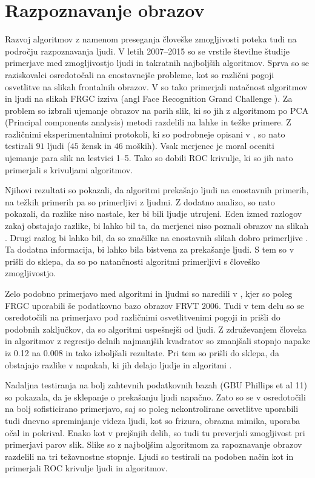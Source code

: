 \section{Razpoznavanje obrazov}
Razvoj algoritmov z namenom preseganja človeške zmogljivosti poteka tudi na področju razpoznavanja ljudi. V letih 2007--2015 so se vrstile številne študije primerjave med zmogljivostjo ljudi in takratnih najboljših algoritmov. Sprva so se raziskovalci osredotočali na enostavnejše probleme, kot so različni pogoji osvetlitve na slikah frontalnih obrazov. V \cite{otoole2007face} so tako primerjali natačnost algoritmov in ljudi na slikah FRGC izziva (angl Face Recognition Grand Challenge \cite{}). Za problem so izbrali ujemanje obrazov na parih slik, ki so jih z algoritmom po PCA (Principal components analysis) metodi razdelili na lahke in težke primere. Z različnimi eksperimentalnimi protokoli, ki so podrobneje opisani v \cite{otoole2007face}, so nato testirali $91$ ljudi ($45$ žensk in $46$ moških). Vsak merjenec je moral oceniti ujemanje para slik na lestvici 1--5. Tako so dobili ROC krivulje, ki so jih nato primerjali s krivuljami algoritmov. 

Njihovi rezultati so pokazali, da algoritmi prekašajo ljudi na enostavnih primerih, na težkih primerih pa so primerljivi z ljudmi. Z dodatno analizo, so nato pokazali, da razlike niso nastale, ker bi bili ljudje utrujeni. Eden izmed razlogov zakaj obstajajo razlike, bi lahko bil ta, da merjenci niso poznali obrazov na slikah \cite{otoole2007face}. Drugi razlog bi lahko bil, da so značilke na enostavnih slikah dobro primerljive \cite{otoole2007face}. Ta dodatna informacija, bi lahko bila bistvena za prekašanje ljudi. S tem so v \cite{otoole2007face} prišli do sklepa, da so po natančnosti algoritmi primerljivi s človeško zmogljivostjo. 

Zelo podobno primerjavo med algoritmi in ljudmi so naredili v \cite{otoole2008humans}, kjer so poleg FRGC uporabili še podatkovno bazo obrazov FRVT 2006. Tudi v tem delu so se osredotočili na primerjavo pod različnimi osvetlitvenimi pogoji in prišli do podobnih zaključkov, da so algoritmi uspešnejši od ljudi. Z združevanjem človeka in algoritmov z regresijo delnih najmanjših kvadratov so zmanjšali stopnjo napake iz \num{0.12} na \num{0.008} in tako izboljšali rezultate. Pri tem so prišli do sklepa, da obstajajo razlike v napakah, ki jih delajo ljudje in algoritmi \cite{otoole2008humans}.

Nadaljna testiranja na bolj zahtevnih podatkovnih bazah (GBU Phillips et al 11\cite{}) so pokazala, da je sklepanje o prekašanju ljudi napačno. Zato so se v \cite{otoole2012comparing} osredotočili na bolj sofisticirano primerjavo, saj so poleg nekontrolirane osvetlitve uporabili tudi dnevno spreminjanje videza ljudi, kot so frizura, obrazna mimika, uporaba očal in pokrival. Enako kot v prejšnjih delih, so tudi tu preverjali zmogljivost pri primerjavi parov slik. Slike so z najboljšim algoritmom za rapoznavanje obrazov razdelili na tri težavnostne stopnje. Ljudi so testirali na podoben način kot \cite{otoole2007face} in primerjali ROC krivulje ljudi in algoritmov.

